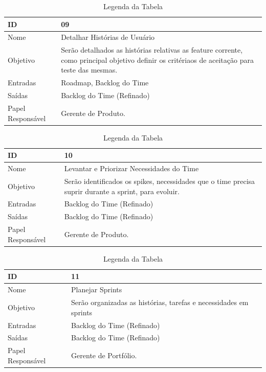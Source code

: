   \begin{table}[H]
    \centering
      \begin{tabular}{| m{5em} | m{10cm} |}
        \hline
        ID       & 09   \\ \hline
        Nome     & Detalhar Histórias de Usuário  \\ \hline
        Objetivo & Serão detalhados as histórias relativas as feature corrente, como principal objetivo definir os critériaos de aceitação para teste das mesmas.  \\ \hline
        Entradas & Roadmap, Backlog do Time\\ \hline
        Saídas   & Backlog do Time (Refinado) \\ \hline
        Papel Responsável   & Gerente de Produto. \\ \hline
      \end{tabular}
      \caption{Legenda da Tabela}
      \label{tabela:atividade9}
  \end{table}

  \begin{table}[H]
    \centering
      \begin{tabular}{| m{5em} | m{10cm} |}
        \hline
        ID       & 10   \\ \hline
        Nome     & Levantar e Priorizar Necessidades do Time  \\ \hline
        Objetivo & Serão identificados os spikes, necessidades que o time precisa suprir durante a sprint, para evoluir.  \\ \hline
        Entradas & Backlog do Time (Refinado)\\ \hline
        Saídas   & Backlog do Time (Refinado) \\ \hline
        Papel Responsável   & Gerente de Produto. \\ \hline
      \end{tabular}
      \caption{Legenda da Tabela}
      \label{tabela:atividade10}
  \end{table}

  \begin{table}[H]
    \centering
      \begin{tabular}{| m{5em} | m{10cm} |}
        \hline
        ID       & 11   \\ \hline
        Nome     & Planejar Sprints  \\ \hline
        Objetivo & Serão organizadas as histórias, tarefas e necessidades em sprints  \\ \hline
        Entradas & Backlog do Time (Refinado)\\ \hline
        Saídas   & Backlog do Time (Refinado) \\ \hline
        Papel Responsável   & Gerente de Portfólio. \\ \hline
      \end{tabular}
      \caption{Legenda da Tabela}
      \label{tabela:atividade11}
  \end{table}
  

